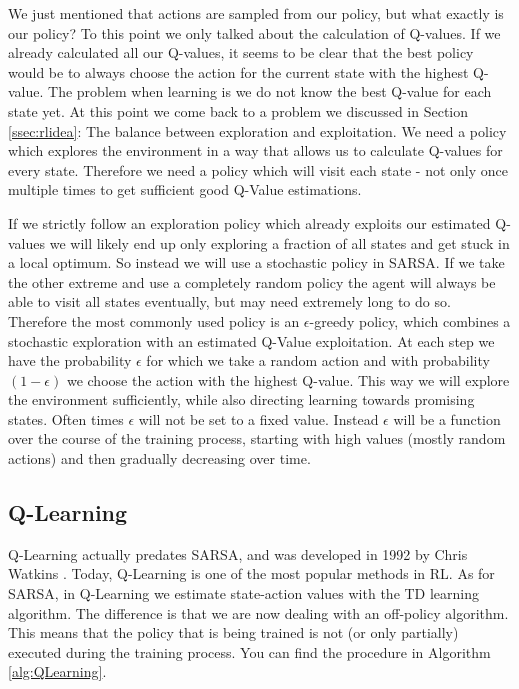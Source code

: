 We just mentioned that actions are sampled from our policy, but what exactly is our policy? To this point we only talked about the calculation of Q-values. If we already calculated all our Q-values, it seems to be clear that the best policy would be to always choose the action for the current state with the highest Q-value. The problem when learning is we do not know the best Q-value for each state yet. At this point we come back to a problem we discussed in Section \ref{ssec:rlidea}: The balance between exploration and exploitation. We need a policy which explores the environment in a way that allows us to calculate Q-values for every state. Therefore we need a policy which will visit each state - not only once multiple times to get sufficient good Q-Value estimations.

If we strictly follow an exploration policy which already exploits our estimated Q-values we will likely end up only exploring a fraction of all states and get stuck in a local optimum. So instead we will use a stochastic policy in SARSA. If we take the other extreme and use a completely random policy the agent will always be able to visit all states eventually, but may need extremely long to do so. Therefore the most commonly used policy is an $\epsilon$-greedy policy, which combines a stochastic exploration with an estimated Q-Value exploitation. At each step we have the probability $\epsilon$ for which we take a random action and with probability $(1 - \epsilon)$ we choose the action with the highest Q-value. This way we will explore the environment sufficiently, while also directing learning towards promising states. Often times $\epsilon$ will not be set to a fixed value. Instead $\epsilon$ will be a function over the course of the training process, starting with high values (mostly random actions) and then gradually decreasing over time. 

\subsection{Q-Learning} \label{ssec:Q_Learning}
Q-Learning actually predates SARSA, and was developed in 1992 by Chris Watkins \cite{watkins1992q}. Today, Q-Learning is one of the most popular methods in RL. As for SARSA, in Q-Learning we estimate state-action values with the TD learning algorithm. The difference is that we are now dealing with an off-policy algorithm. This means that the policy that is being trained is not (or only partially) executed during the training process. You can find the procedure in Algorithm \ref{alg:QLearning}.  

